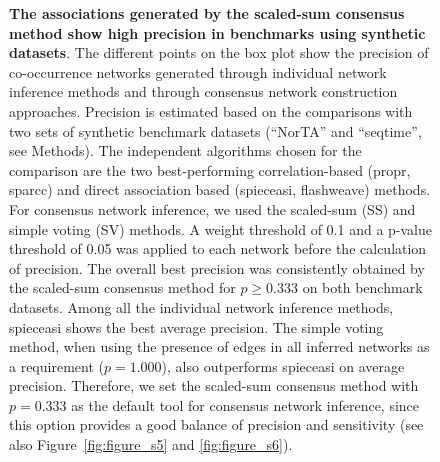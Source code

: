   \begin{figure}[H]
    \centering
    \caption{
      \textbf{The associations generated by the scaled-sum consensus method show high precision in benchmarks using synthetic datasets}.
    The different points on the box plot show the precision of co-occurrence networks generated through individual network inference methods and through consensus network construction approaches. Precision is estimated based on the comparisons with two sets of synthetic benchmark datasets (``NorTA'' and ``seqtime'', see Methods).
      The independent algorithms chosen for the comparison are the two best-performing correlation-based (propr, sparcc) and direct association based (spieceasi, flashweave) methods.
      For consensus network inference, we used the scaled-sum (SS) and simple voting (SV) methods.
      A weight threshold of 0.1 and a p-value threshold of 0.05 was applied to each network before the calculation of precision.
      The overall best precision was consistently obtained by the scaled-sum consensus method for $p \geq 0.333$ on both benchmark datasets. Among all the individual network inference methods, spieceasi shows the best average precision.
      The simple voting method, when using the presence of edges in all inferred networks as a requirement ($p = 1.000$), also outperforms spieceasi on average precision.
      Therefore, we set the scaled-sum consensus method with $p = 0.333$ as the default tool for consensus network inference, since this option provides a good balance of precision and sensitivity (see also Figure~\ref{fig:figure_s5} and \ref{fig:figure_s6}).
    }
    \label{fig:figure5}
  \end{figure}


